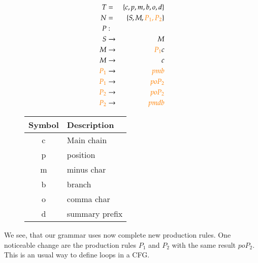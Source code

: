 \documentclass[a4paper,10pt]{article}
\newcommand{\captionVSpace}{\vspace*{-0.05cm}}
\newcommand{\CFGDefinitionSize}{0.60}
\newcommand{\SymbolDescriptionTable}{0.35}
\newcommand{\colorNew}{orange}
\begin{document}
\begin{figure}[H]
    \begin{minipage}[l]{\CFGDefinitionSize\textwidth}
        $$
        \begin{aligned}
            T &=& \{c, p, m, b, o, d\} \\
            N &=& \{S, M, {\color{\colorNew}P_1, P_2}\} \\
            P &:& \\
            S &\rightarrow& M \\
            M &\rightarrow& {\color{\colorNew}P_1}c \\
            M &\rightarrow& c \\
            {\color{\colorNew}P_1} &\rightarrow& {\color{\colorNew}pmb} \\
            {\color{\colorNew}P_1} &\rightarrow& {\color{\colorNew}poP_2} \\
            {\color{\colorNew}P_2} &\rightarrow& {\color{\colorNew}poP_2} \\
            {\color{\colorNew}P_2} &\rightarrow& {\color{\colorNew}pmdb} \\
        \end{aligned}
        $$
        \caption{Adjusted CFG with $P_1$ and $P_2$.}
        \label{fig:CFGWithMultipleBranchesAtTheSameLengthNewApproach}
    \end{minipage}
    \begin{minipage}[r]{\SymbolDescriptionTable\textwidth}
        \begin{table}[H]
        \centering
            \begin{tabular}{c|l}
                \toprule
                \textbf{Symbol} & \textbf{Description} \\
                \midrule
                c & Main chain \\
                p & position \\
                m & minus char \\
                b & branch \\
                o & comma char \\
                d & summary prefix \\
                \bottomrule
            \end{tabular}
        \end{table}
    \end{minipage}
\end{figure}

We see, that our grammar uses now complete new production rules. One noticeable change are the production rules $P_1$ and $P_2$ with the same result $poP_2$. This is an usual way to define loops in a CFG.
\end{document}
